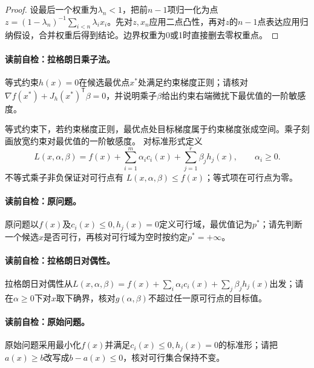 \begin{proof}
设最后一个权重为$\lambda_n<1$，把前$n-1$项归一化为点 $z=(1-\lambda_n)^{-1}\sum_{i<n}\lambda_ix_i$。先对$z,x_n$应用二点凸性，再对$z$的$n-1$点表达应用归纳假设，合并权重后得到结论。边界权重为0或1时直接删去零权重点。
\end{proof}


\paragraph{读前自检：拉格朗日乘子法。}等式约束$h(x)=0$在候选最优点$x^*$处满足约束梯度正则；请核对$\nabla f(x^*)+J_h(x^*)^{\mathsf T}\beta=0$，并说明乘子$\beta$给出约束右端微扰下最优值的一阶敏感度。\par

等式约束下，若约束梯度正则，最优点处目标梯度属于约束梯度张成空间。乘子刻画放宽约束对最优值的一阶敏感度。
对标准形式定义
\[
L(x,\alpha,\beta)=f(x)+\sum_{i=1}^{m}\alpha_i c_i(x)+\sum_{j=1}^{r}\beta_jh_j(x),
\qquad \alpha_i\ge0.
\]
不等式乘子非负保证对可行点有 $L(x,\alpha,\beta)\le f(x)$；等式项在可行点为零。


\paragraph{读前自检：原问题。}原问题以$f(x)$及$c_i(x)\le0,h_j(x)=0$定义可行域，最优值记为$p^*$；请先判断一个候选$x$是否可行，再核对可行域为空时按约定$p^*=+\infty$。\par
\paragraph{读前自检：拉格朗日对偶性。}拉格朗日对偶性从$L(x,\alpha,\beta)=f(x)+\sum_i\alpha_ic_i(x)+\sum_j\beta_jh_j(x)$出发；请在$\alpha\ge0$下对$x$取下确界，核对$g(\alpha,\beta)$不超过任一原可行点的目标值。\par
\paragraph{读前自检：原始问题。}原始问题采用最小化$f(x)$并满足$c_i(x)\le0,h_j(x)=0$的标准形；请把$a(x)\ge b$改写成$b-a(x)\le0$，核对可行集合保持不变。\par
